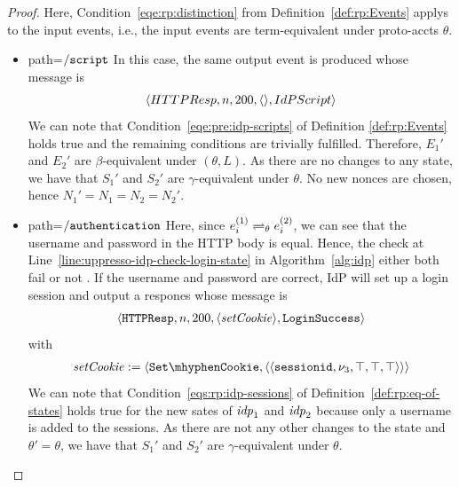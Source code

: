 \begin{proof}
    Here, Condition~\ref{eqe:rp:distinction} from Definition~\ref{def:rp:Events} applys to the input events,
    i.e., the input events are term-equivalent under proto-accts $\theta$. 
    \begin{itemize}
      \item path=$\mathtt{/script}$ 
        In this case, the same output event is produced whose message is 
        \begin{equation}
          \begin{aligned}
            \langle {{}HTTPResp,n,200,\langle {{}} \rangle,IdPScript} \rangle
          \end{aligned}
        \end{equation}
        We can note that Condition~\ref{eqe:pre:idp-scripts} of Definition \ref{def:rp:Events} holds true and the remaining conditions are trivially fulfilled.
        Therefore, $E_1\prime$ and $E_2\prime$ are $\beta$-equivalent under $(\theta, L)$. 
        As there are no changes to any state, we have that $S_1\prime$ and $S_2\prime$ are $\gamma$-equivalent under $\theta$. 
        No new nonces are chosen, hence $N_1\prime=N_1=N_2=N_2\prime$.
      \item path=$\mathtt{/authentication}$ 
        Here, since $e_i^{(1)} \rightleftharpoons_{\theta} e_i^{(2)}$, we can see that the username and password in the HTTP body is equal. 
        Hence, the check at Line~\ref{line:uppresso-idp-check-login-state} in Algorithm~\ref{alg:idp} either both fail or not . 
        If the username and password are correct, IdP will set up a login session and output a respones whose message is 
        \begin{align*}
          \langle {{}\mathtt{HTTPResp},n,200,\langle\mathit{setCookie}\rangle,\mathtt{LoginSuccess}} \rangle
        \end{align*}
        with
        \begin{align*}
          \mi{setCookie} := \myangle{\cSetCookie, \myangle{\myangle{\str{sessionid}, \nu_3, \True, \True, \True}}} \\
        \end{align*}
        We can note that Condition~\ref{eqs:rp:idp-sessions} of Definition~\ref{def:rp:eq-of-states} holds true for the new sates of $\mathit{idp}_1$ and $\mathit{idp}_2$ because only a username is added to the sessions.
        As there are not any other changes to the state and $\theta\prime = \theta$, we have that $S_1\prime$ and $S_2\prime$ are $\gamma$-equivalent under $\theta$. 
        

\end{itemize}
\end{proof}
